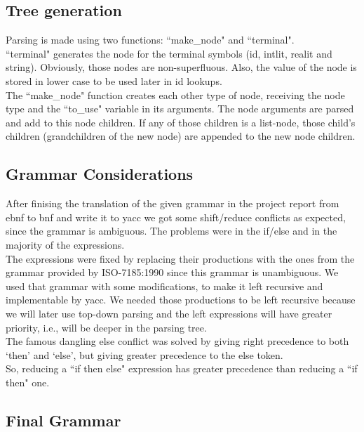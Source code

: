 \documentclass[12pt]{article}
\begin{document}
\subsection{Tree generation}

Parsing is made using two functions: ``make\_node" and ``terminal". \\
``terminal" generates the node for the terminal symbols (id, intlit, realit and string). Obviously, those nodes are non-superfluous. Also, the value of the node is stored in lower case to be used later in id lookups.\\
The ``make\_node" function creates each other type of node, receiving the node type and the ``to\_use" variable in its arguments. The node arguments are parsed and add to this node children. If any of those children is a list-node, those child's children (grandchildren of the new node) are appended to the new node children.\\

\subsection{Grammar Considerations}

After finising the translation of the given grammar in the project report from ebnf to bnf and write it to yacc we got some shift/reduce conflicts as expected, since the grammar is ambiguous. The problems were in the if/else and in the majority of the expressions. \\
The expressions were fixed by replacing their productions with the ones from the grammar provided by ISO-7185:1990 since this grammar is unambiguous. We used that grammar with some modifications, to make it left recursive and implementable by yacc. We needed those productions to be left recursive because we will later use top-down parsing and the left expressions will have greater priority, i.e., will be deeper in the parsing tree. \\
The famous dangling else conflict was solved by giving right precedence to both `then' and `else', but giving greater precedence to the else token. \\
So, reducing a ``if then else" expression has greater precedence than reducing a ``if then" one. \\

\subsection{Final Grammar}
\end{document}
